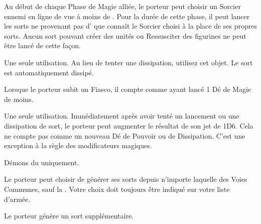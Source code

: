 \begin{multicols}{2}
Au début de chaque Phase de Magie alliée, le porteur peut choisir un Sorcier ennemi en ligne de vue à moins de . Pour la durée de cette phase, il peut lancer les sorts ne provenant pas d'\boundspell{} que connaît le Sorcier choisi à la place de ses propres sorts. Aucun sort pouvant créer des unités ou Ressusciter des figurines ne peut être lancé de cette façon.

Une seule utilisation. Au lieu de tenter une dissipation, utilisez cet objet. Le sort est automatiquement dissipé.

Lorsque le porteur subit un Fiasco, il compte comme ayant lancé 1 Dé de Magie de moins.

Une seule utilisation. Immédiatement après avoir tenté un lancement ou une dissipation de sort, le porteur peut augmenter le résultat de son jet de 1D6. Cela ne compte pas comme un nouveau Dé de Pouvoir ou de Dissipation. C'est une exception à la règle des modificateurs magiques.

Démons du \textbf{\dchange} uniquement.

Le porteur peut choisir de générer ses sorts depuis n'importe laquelle des Voies Communes, sauf la \Pathof{} \light{}. Votre choix doit toujours être indiqué sur votre liste d'armée.

Le porteur génère un sort supplémentaire.

\endpricelist

\end{multicols}
\closearmynewsection













\quickrefsheettitle

